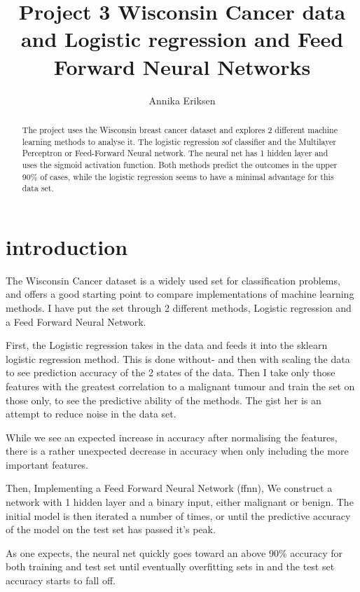 \documentclass[10pt]{article}
\title{Project 3
	Wisconsin Cancer data and Logistic regression and Feed Forward Neural Networks}
\author{Annika Eriksen}
\begin{document}
\maketitle

\begin{abstract}
	The project uses the Wisconsin breast cancer dataset and explores 2
	different machine learning methods to analyse it. The logistic regression
	sof classifier and the Multilayer Perceptron or Feed-Forward Neural
	network. The neural net has 1 hidden layer and uses the sigmoid activation
	function.  Both methods predict the outcomes in the upper 90\% of cases,
	while the logistic regression seems to have a minimal advantage for this
	data set.
\end{abstract}

\section{introduction}

The Wisconsin Cancer dataset is a widely used set for classification
problems, and offers a good starting point to compare implementations of
machine learning methods. I have put the set through 2 different methods,
Logistic regression and a Feed Forward Neural Network. 

First, the Logistic regression takes in the data and feeds it into the sklearn
logistic regression method.  This is done without- and then with scaling the
data to see prediction accuracy of the 2 states of the data. Then I take only
those features with the greatest correlation to a malignant tumour and train
the set on those only, to see the predictive ability of the methods. The gist
her is an attempt to reduce noise in the data set.

While we see an expected increase in accuracy after normalising the features,
there is a rather unexpected decrease in accuracy when only including the more
important features.

Then, Implementing a Feed Forward Neural Network (ffnn), We construct a
network with 1 hidden layer and a binary input, either malignant or benign.
The initial model is then iterated a number of times, or until the
predictive accuracy of the model on the test set has passed it's peak. 

As one expects, the neural net quickly goes toward an above 90\% accuracy for
both training and test set until eventually overfitting sets in and the test
set accuracy starts to fall off. 
\end{document}
